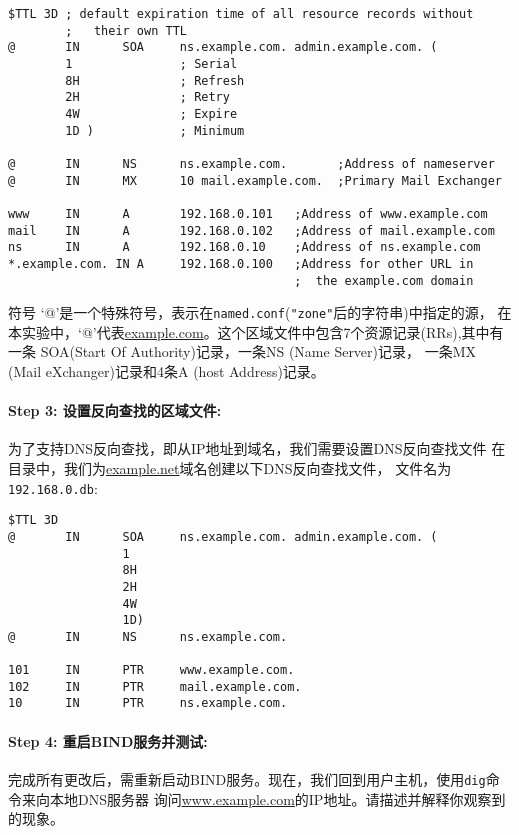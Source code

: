 \vspace{0.2in}
\begin{lstlisting}
$TTL 3D ; default expiration time of all resource records without
        ;   their own TTL
@       IN      SOA     ns.example.com. admin.example.com. (
        1               ; Serial
        8H              ; Refresh
        2H              ; Retry
        4W              ; Expire
        1D )            ; Minimum

@       IN      NS      ns.example.com.       ;Address of nameserver
@       IN      MX      10 mail.example.com.  ;Primary Mail Exchanger

www     IN      A       192.168.0.101   ;Address of www.example.com
mail    IN      A       192.168.0.102   ;Address of mail.example.com
ns      IN      A       192.168.0.10    ;Address of ns.example.com
*.example.com. IN A     192.168.0.100   ;Address for other URL in
                                        ;  the example.com domain
\end{lstlisting}


符号 `@'是一个特殊符号，表示在{\tt named.conf}(\texttt{"zone"}后的字符串)中指定的源，
在本实验中，`@'代表\url{example.com}。这个区域文件中包含7个资源记录(RRs),其中有一条
SOA(Start Of Authority)记录，一条NS (Name Server)记录，
一条MX (Mail eXchanger)记录和4条A (host Address)记录。



\paragraph{Step 3: 设置反向查找的区域文件:}
为了支持DNS反向查找，即从IP地址到域名，我们需要设置DNS反向查找文件
在 目录中，我们为\url{example.net}域名创建以下DNS反向查找文件，
文件名为\texttt{192.168.0.db}:
\begin{lstlisting}
$TTL 3D
@       IN      SOA     ns.example.com. admin.example.com. (
                1
                8H
                2H
                4W
                1D)
@       IN      NS      ns.example.com.

101     IN      PTR     www.example.com.
102     IN      PTR     mail.example.com.
10      IN      PTR     ns.example.com.
\end{lstlisting}


\paragraph{Step 4: 重启BIND服务并测试:}
完成所有更改后，需重新启动BIND服务。现在，我们回到用户主机，使用\texttt{dig}命令来向本地DNS服务器
询问\url{www.example.com}的IP地址。请描述并解释你观察到的现象。








